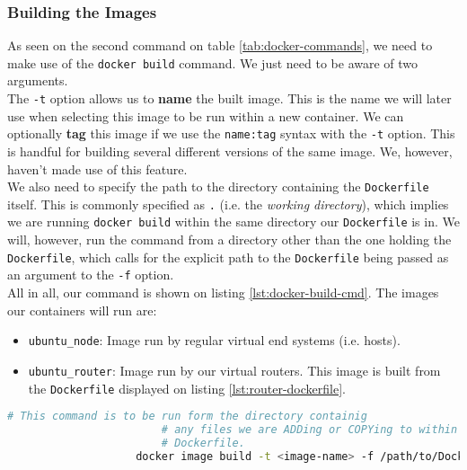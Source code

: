             \subsubsection{Building the Images}
                As seen on the second command on table \ref{tab:docker-commands}, we need to make use of the \texttt{docker build} command. We just need to be aware of two arguments.\\

                The \texttt{-t} option allows us to \textbf{name} the built image. This is the name we will later use when selecting this image to be run within a new container. We can optionally \textbf{tag} this image if we use the \texttt{name:tag} syntax with the \texttt{-t} option. This is handful for building several different versions of the same image. We, however, haven't made use of this feature.\\

                We also need to specify the path to the directory containing the \texttt{Dockerfile} itself. This is commonly specified as \texttt{.} (i.e. the \textit{working directory}), which implies we are running \texttt{docker build} within the same directory our \texttt{Dockerfile} is in. We will, however, run the command from a directory other than the one holding the \texttt{Dockerfile}, which calls for the explicit path to the \texttt{Dockerfile} being passed as an argument to the \texttt{-f} option.\\

                All in all, our command is shown on listing \ref{lst:docker-build-cmd}. The images our containers will run are:\\

                \begin{itemize}
                    \item \texttt{ubuntu\_node}: Image run by regular virtual end systems (i.e. hosts).
                    \item \texttt{ubuntu\_router}: Image run by our virtual routers. This image is built from the \texttt{Dockerfile} displayed on listing \ref{lst:router-dockerfile}.
                \end{itemize}

                \begin{lstlisting}[language = bash, caption = Building an image from a \texttt{Dockerfile}., label = lst:docker-build-cmd]
                    # This command is to be run form the directory containig
                        # any files we are ADDing or COPYing to within the
                        # Dockerfile.
                    docker image build -t <image-name> -f /path/to/Dockerfile .
                \end{lstlisting}

